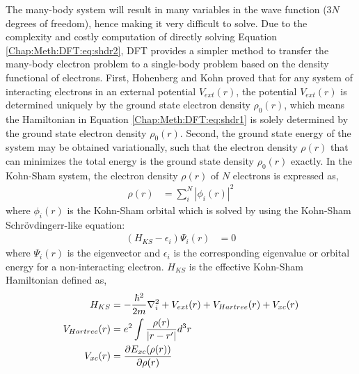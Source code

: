 The many-body system will result in many variables in the wave function ($3N$ degrees of freedom), hence making it very difficult to solve. Due to the complexity and costly computation of directly solving Equation \ref{Chap:Meth:DFT:eq:shdr2}, \acf{DFT} provides a simpler method to transfer the many-body electron problem to a single-body problem based on the density functional of electrons. \cite{wilson1984electron, kohn1965self} First, Hohenberg and Kohn proved that for any system of interacting electrons in an external potential $V_{ext}(r)$, the potential $V_{ext}(r)$ is determined uniquely by the ground state electron density $\rho_0(r)$, which means the Hamiltonian in Equation \ref{Chap:Meth:DFT:eq:shdr1} is solely determined by the ground state electron density $\rho_0(r)$. Second, the ground state energy of the system may be obtained variationally, such that the electron density $\rho(r)$ that can minimizes the total energy is the ground state density $\rho_0(r)$ exactly. In the Kohn-Sham system, the electron density $\rho(r)$ of $N$ electrons \cite{kohn1965self} is expressed as,
\begin{subequations}
\begin{align}
\rho(r) & = \sum_i^N {|\phi_i(r)|}^2 \label{Chap:Meth:DFT:eq:ks_rho}
\end{align}
\end{subequations}
where $\phi_i(r)$ is the Kohn-Sham orbital which is solved by using the Kohn-Sham Schr\"{o}vdingerr-like equation:
\begin{subequations}
\begin{align}
(H_{KS} - \epsilon_i) \Psi_i(r) & = 0 \label{Chap:Meth:DFT:eq:ks_1}
\end{align}
\end{subequations}
where $\Psi_i(r)$ is the eigenvector and $\epsilon_i$ is the corresponding eigenvalue or orbital energy for a non-interacting electron. $H_{KS}$ is the effective Kohn-Sham Hamiltonian defined as,
\begin{subequations}
\begin{align}
  H_{KS} & = -\frac{\hbar^2}{2m}\nabla_i^2 + V_{ext}(r) + V_{Hartree}(r) + V_{xc}(r) \label{Chap:Meth:DFT:eq:ks_H} \\ 
  \hfill
  V_{Hartree}(r) & = e^2\int \frac{\rho(r)}{|r - r'|} d^3r \label{Chap:Meth:DFT:eq:ks_Hartree}\\ 
  \hfill
  V_{xc}(r) & = \frac{\partial E_{xc}(\rho(r))}{\partial \rho(r)} \label{Chap:Meth:DFT:eq:ks_xc} 
\end{align}
\end{subequations}
